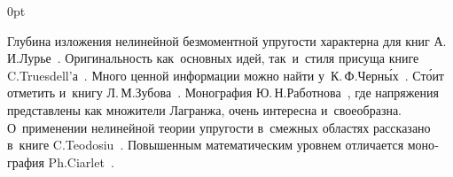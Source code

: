 \begin{changemargin}{\parindent}{0pt}
\fontsize{10}{12}\selectfont

\begin{otherlanguage}{russian}

Глубина изложения нелинейной безмоментной упругости характерна для книг А.\,И.\:Лурье~\cite{lurie-nonlinearelasticity, lurie-theoryofelasticity}. Оригинальность как~основных идей, так~и~стиля присуща книге C.\:Truesdell’а~\cite{truesdell-firstcourse}. Много ценной информации можно найти у~К.\,Ф.\:Черн\'{ы}х~\cite{chernyh-nonlinearelasticity}. Ст\'{о}ит отметить и~книгу Л.\,М.\:Зубова~\cite{zubov}. Монография Ю.\,Н.\:Работнова~\cite{rabotnov-mechanicsofdeformable}, где напряжения представлены как множители Лагранжа, очень интересна и~своеобразна. О~применении нелинейной теории упругости в~смежных областях рассказано в~книге C.\:Teodosiu~\cite{teodosiu-crystaldefects}. Повышенным математическим уровнем отличается монография Ph.\:Ciarlet~\cite{ciarlet-mathematicalelasticity}.
\par

\end{otherlanguage}

\end{changemargin}
